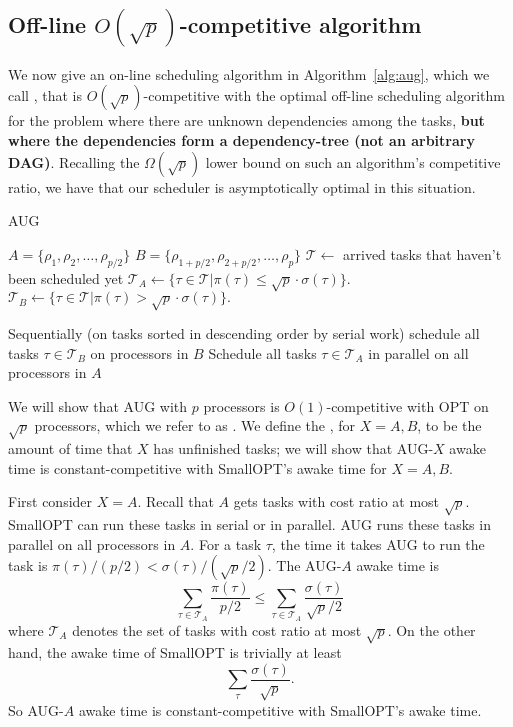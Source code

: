 \subsection{Off-line $O(\sqrt{p})$-competitive algorithm}


We now give an on-line scheduling algorithm in
Algorithm~\ref{alg:aug}, which we call , that is
$O(\sqrt{p})$-competitive with the optimal off-line scheduling
algorithm for the problem where there are unknown dependencies
among the tasks, \textbf{but where the dependencies form a
dependency-tree (not an arbitrary DAG)}.
Recalling the $\Omega(\sqrt{p})$ lower bound on such an
algorithm's competitive ratio, we have that our scheduler is
asymptotically optimal in this situation.

\begin{algorithm}
  \caption{AUG}
  \label{alg:aug}
  \begin{algorithmic}
    \State $A = \{\rho_1, \rho_2, \ldots, \rho_{p/2} \}$
    \State $B = \{\rho_{1+p/2}, \rho_{2+p/2}, \ldots, \rho_{p} \}$
    \State
    \State $\mathcal{T} \gets$ arrived tasks that haven't been scheduled yet
    \State $\mathcal{T}_A \gets \{ \tau \in \mathcal{T} | \pi(\tau) \le \sqrt{p} \cdot \sigma(\tau) \}.$
    \State $\mathcal{T}_B \gets \{ \tau\in \mathcal{T}  | \pi(\tau) > \sqrt{p} \cdot \sigma(\tau) \}.$
    \State
    
    \State Sequentially (on tasks sorted in descending order by
    serial work) schedule all tasks $\tau \in \mathcal{T}_B$ on
    processors in $B$
    \EndIf
    \State Schedule all tasks $\tau \in \mathcal{T}_A$ in parallel on all processors in $A$

  \end{algorithmic}
\end{algorithm}

We will show that AUG with $p$ processors is $O(1)$-competitive
with OPT on $\sqrt{p}$ processors, which we refer to as
. We define the , for $X=A,B$, to be the amount of time that $X$ has
unfinished tasks; we will show that AUG-$X$ awake time is
constant-competitive with SmallOPT's awake time for $X=A,B$.

First consider $X=A$. Recall that $A$ gets tasks with cost ratio
at most $\sqrt{p}$. SmallOPT can run these tasks in serial or in
parallel. AUG runs these tasks in parallel on all processors in
$A$. For a task $\tau$, the time it takes AUG to run the task is
$\pi(\tau)/(p/2) < \sigma(\tau)/ (\sqrt{p}/2)$. The AUG-$A$ awake
time is 
$$\sum_{\tau \in \mathcal{T}_A} \frac{\pi(\tau)}{p/2} \le \sum_{\tau \in \mathcal{T}_A} \frac{\sigma(\tau)}{\sqrt{p}/2}$$
where $\mathcal{T}_A$ denotes the set of tasks with cost ratio at most $\sqrt{p}$.
On the other hand, the awake time of SmallOPT is trivially at least 
$$\sum_{\tau} \frac{\sigma(\tau)}{\sqrt{p}}.$$
So AUG-$A$ awake time is constant-competitive with SmallOPT's awake time.


